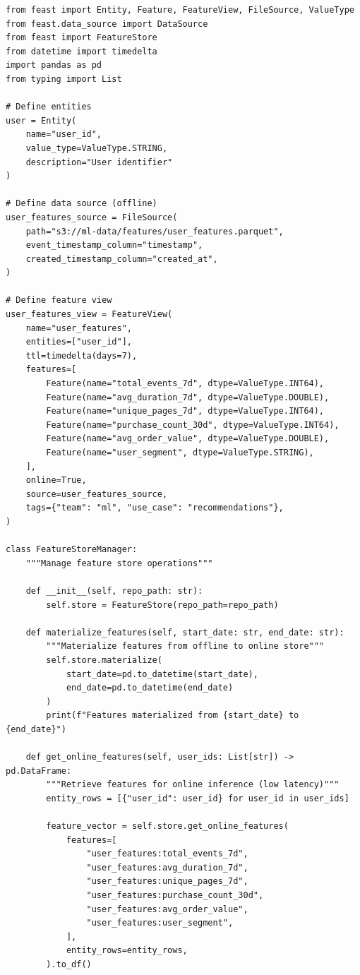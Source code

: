 \begin{lstlisting}[style=python, caption=Feature store implementation with Feast]
from feast import Entity, Feature, FeatureView, FileSource, ValueType
from feast.data_source import DataSource
from feast import FeatureStore
from datetime import timedelta
import pandas as pd
from typing import List

# Define entities
user = Entity(
    name="user_id",
    value_type=ValueType.STRING,
    description="User identifier"
)

# Define data source (offline)
user_features_source = FileSource(
    path="s3://ml-data/features/user_features.parquet",
    event_timestamp_column="timestamp",
    created_timestamp_column="created_at",
)

# Define feature view
user_features_view = FeatureView(
    name="user_features",
    entities=["user_id"],
    ttl=timedelta(days=7),
    features=[
        Feature(name="total_events_7d", dtype=ValueType.INT64),
        Feature(name="avg_duration_7d", dtype=ValueType.DOUBLE),
        Feature(name="unique_pages_7d", dtype=ValueType.INT64),
        Feature(name="purchase_count_30d", dtype=ValueType.INT64),
        Feature(name="avg_order_value", dtype=ValueType.DOUBLE),
        Feature(name="user_segment", dtype=ValueType.STRING),
    ],
    online=True,
    source=user_features_source,
    tags={"team": "ml", "use_case": "recommendations"},
)

class FeatureStoreManager:
    """Manage feature store operations"""

    def __init__(self, repo_path: str):
        self.store = FeatureStore(repo_path=repo_path)

    def materialize_features(self, start_date: str, end_date: str):
        """Materialize features from offline to online store"""
        self.store.materialize(
            start_date=pd.to_datetime(start_date),
            end_date=pd.to_datetime(end_date)
        )
        print(f"Features materialized from {start_date} to {end_date}")

    def get_online_features(self, user_ids: List[str]) -> pd.DataFrame:
        """Retrieve features for online inference (low latency)"""
        entity_rows = [{"user_id": user_id} for user_id in user_ids]

        feature_vector = self.store.get_online_features(
            features=[
                "user_features:total_events_7d",
                "user_features:avg_duration_7d",
                "user_features:unique_pages_7d",
                "user_features:purchase_count_30d",
                "user_features:avg_order_value",
                "user_features:user_segment",
            ],
            entity_rows=entity_rows,
        ).to_df()


\end{lstlisting}
